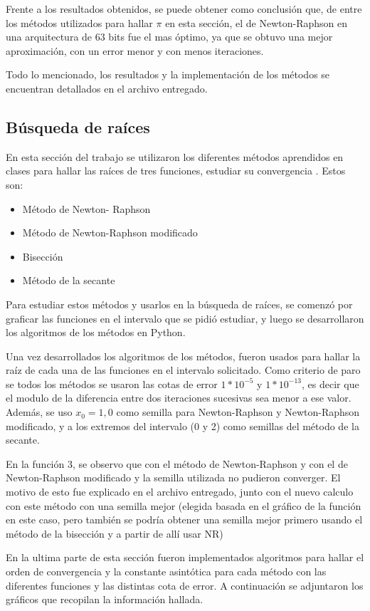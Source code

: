 \documentclass[titlepage,a4paper]{article}
\begin{document}
Frente a los resultados obtenidos, se puede obtener como conclusión que, de entre los métodos utilizados para hallar $\pi$ en esta sección, el de Newton-Raphson en una arquitectura de 63 bits fue el mas óptimo, ya que se obtuvo una mejor aproximación, con un error menor y con menos iteraciones.

Todo lo mencionado, los resultados y la implementación de los métodos se encuentran detallados en el archivo entregado.


\subsection{Búsqueda de raíces}
En esta sección del trabajo se utilizaron los diferentes métodos aprendidos en clases para hallar las raíces de tres funciones, estudiar su convergencia .
Estos son:
\begin{itemize}
    \item Método de Newton- Raphson
    \item Método de Newton-Raphson modificado
    \item Bisección
    \item Método de la secante
\end{itemize}
Para estudiar estos métodos y usarlos en la búsqueda de raíces, se comenzó por graficar las funciones en el intervalo que se pidió estudiar, y luego se desarrollaron los algoritmos de los métodos en Python.

Una vez desarrollados los algoritmos de los métodos, fueron usados para hallar la raíz de cada una de las funciones en el intervalo solicitado. Como criterio de paro se todos los métodos se usaron las cotas de error $1*10^{-5}$ y $1*10^{-13}$, es decir que el modulo de la diferencia entre dos iteraciones sucesivas sea menor a ese valor. Además, se uso $x_0=1,0$ como semilla para Newton-Raphson y Newton-Raphson modificado, y a los extremos del intervalo (0 y 2) como semillas del método de la secante.

En la función 3, se observo que con el método de Newton-Raphson y con el de Newton-Raphson modificado y la semilla utilizada no pudieron converger. El motivo de esto fue explicado en el archivo entregado, junto con el nuevo calculo con este método con una semilla mejor (elegida basada en el gráfico de la función en este caso, pero también se podría obtener una semilla mejor primero usando el método de la bisección y a partir de allí usar NR) 

En la ultima parte de esta sección fueron implementados algoritmos para hallar el orden de convergencia y la constante asintótica para cada método con las diferentes funciones y las distintas cota de error. A continuación se adjuntaron los gráficos que recopilan la información hallada.
\end{document}
